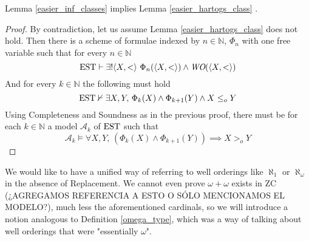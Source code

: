 \begin{theorem}
	Lemma \ref{easier_inf_classes} implies Lemma \ref{easier_hartogs_class} .
\end{theorem}
\begin{proof}
	By contradiction, let us assume Lemma \ref{easier_hartogs_class} does not hold. Then there is a scheme of formulae indexed by $n\in\mathbb{N}$, $\Phi_n$ with one free variable such that for every $n\in\mathbb{N}$
	\[
		\operatorname{EST} \vdash \exists! \langle X, < \rangle \ \Phi_n ( \langle X,<\rangle) \land 
		\emph{WO}(\langle X, < \rangle)
	\]
	And for every $k\in\mathbb{N}$ the following must hold
	\[			
		\operatorname{EST} \nvdash \exists X,Y, \, \Phi_k (X) \land \Phi_{k+1} (Y) \land X \leq_o Y
	\]	
	Using Completeness and Soundness as in the previous proof, there must be for each $k\in\mathbb{N}$ a model $\mathcal{A}_k$ of $\operatorname{EST}$ such that
	\[
		\mathcal{A}_k \vDash \forall X,Y, \, (\Phi_k (X) \land \Phi_{k+1} (Y)) \implies X >_o Y
	\]	
\end{proof}

We would like to have a unified way of referring to well orderings like $\aleph_1$ or $\aleph_\omega$ in the absence of Replacement. We cannot even prove $\omega+\omega$ exists in ZC (¿AGREGAMOS REFERENCIA A ESTO O SÓLO MENCIONAMOS EL MODELO?), much less the aforementioned cardinals, so we will introduce a notion analogous to Definition \ref{omega_type}, which was a way of talking about well orderings that were "essentially $\omega$".

